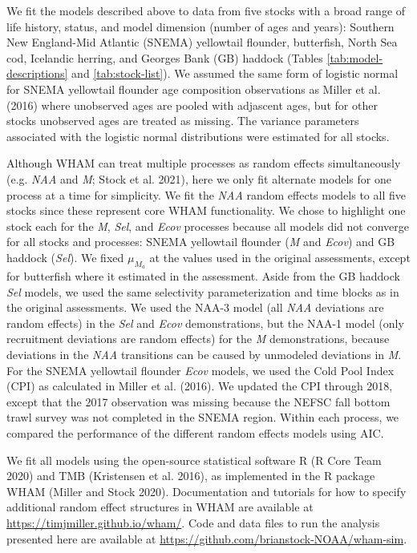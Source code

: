 \documentclass[]{article}
\begin{document}
We fit the models described above to data from five stocks with a broad
range of life history, status, and model dimension (number of ages and
years): Southern New England-Mid Atlantic (SNEMA) yellowtail flounder,
butterfish, North Sea cod, Icelandic herring, and Georges Bank (GB)
haddock (Tables \ref{tab:model-descriptions} and \ref{tab:stock-list}).
We assumed the same form of logistic normal for SNEMA yellowtail
flounder age composition observations as Miller et al. (2016) where
unobserved ages are pooled with adjascent ages, but for other stocks
unobserved ages are treated as missing. The variance parameters
associated with the logistic normal distributions were estimated for all
stocks.

Although WHAM can treat multiple processes as random effects
simultaneously (e.g. \emph{NAA} and \emph{M}; Stock et al. 2021), here
we only fit alternate models for one process at a time for simplicity.
We fit the \emph{NAA} random effects models to all five stocks since
these represent core WHAM functionality. We chose to highlight one stock
each for the \emph{M}, \emph{Sel}, and \emph{Ecov} processes because all
models did not converge for all stocks and processes: SNEMA yellowtail
flounder (\emph{M} and \emph{Ecov}) and GB haddock (\emph{Sel}). We
fixed \(\mu_{M_a}\) at the values used in the original assessments,
except for butterfish where it estimated in the assessment. Aside from
the GB haddock \emph{Sel} models, we used the same selectivity
parameterization and time blocks as in the original assessments. We used
the NAA-3 model (all \emph{NAA} deviations are random effects) in the
\emph{Sel} and \emph{Ecov} demonstrations, but the NAA-1 model (only
recruitment deviations are random effects) for the \emph{M}
demonstrations, because deviations in the \emph{NAA} transitions can be
caused by unmodeled deviations in \emph{M}. For the SNEMA yellowtail
flounder \emph{Ecov} models, we used the Cold Pool Index (CPI) as
calculated in Miller et al. (2016). We updated the CPI through 2018,
except that the 2017 observation was missing because the NEFSC fall
bottom trawl survey was not completed in the SNEMA region. Within each
process, we compared the performance of the different random effects
models using AIC.

We fit all models using the open-source statistical software R (R Core
Team 2020) and TMB (Kristensen et al. 2016), as implemented in the R
package WHAM (Miller and Stock 2020). Documentation and tutorials for
how to specify additional random effect structures in WHAM are available
at \url{https://timjmiller.github.io/wham/}. Code and data files to run
the analysis presented here are available at
\url{https://github.com/brianstock-NOAA/wham-sim}.
\end{document}
